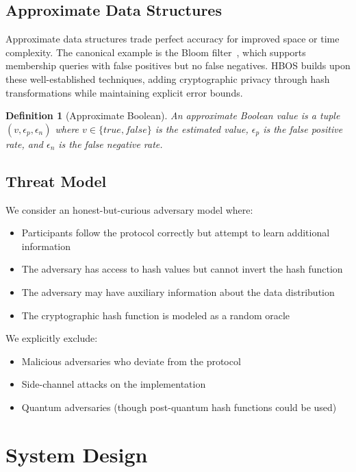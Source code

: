 \documentclass[10pt,conference]{IEEEtran}
\newtheorem{definition}[theorem]{Definition}
\begin{document}
\subsection{Approximate Data Structures}

Approximate data structures trade perfect accuracy for improved space or time complexity. The canonical example is the Bloom filter~\cite{bloom1970space}, which supports membership queries with false positives but no false negatives. HBOS builds upon these well-established techniques, adding cryptographic privacy through hash transformations while maintaining explicit error bounds.

\begin{definition}[Approximate Boolean]
An approximate Boolean value is a tuple $(v, \epsilon_p, \epsilon_n)$ where $v \in \{true, false\}$ is the estimated value, $\epsilon_p$ is the false positive rate, and $\epsilon_n$ is the false negative rate.
\end{definition}

\subsection{Threat Model}

We consider an honest-but-curious adversary model where:
\begin{itemize}
\item Participants follow the protocol correctly but attempt to learn additional information
\item The adversary has access to hash values but cannot invert the hash function
\item The adversary may have auxiliary information about the data distribution
\item The cryptographic hash function is modeled as a random oracle
\end{itemize}

We explicitly exclude:
\begin{itemize}
\item Malicious adversaries who deviate from the protocol
\item Side-channel attacks on the implementation
\item Quantum adversaries (though post-quantum hash functions could be used)
\end{itemize}

\section{System Design}
\label{sec:design}
\end{document}

